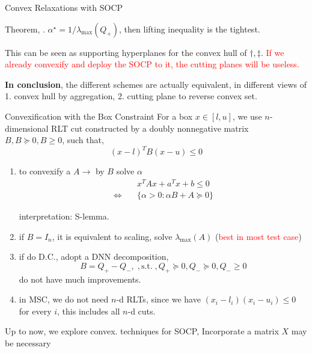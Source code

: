 \documentclass[aspectratio=1612, 10pt]{beamer}
\newcommand{\st}{\mathrm{s.t.\;}}
\newcommand{\red}[1]{\textcolor{red}{#1}}
\begin{document}
\begin{frame}[allowframebreaks]{Convex Relaxations with SOCP}
\begin{enumerate}
  \end{enumerate}

  \framebreak

  Theorem, \cite{bienstock_cutting-planes_2014}. \(\alpha^\star = 1/\lambda_{\max} (Q_+)\), then lifting inequality is the tightest.

  This can be seen as supporting hyperplanes for the convex hull of \(\dagger, \ddagger\). \red{If we already convexify and deploy the SOCP to it, the cutting planes will be useless.}

  \textbf{In conclusion},
  the different schemes are actually equivalent, in different views of 1. convex hull by aggregation, 2. cutting plane to reverse convex set.
  \framebreak

\end{frame}

\begin{frame}[allowframebreaks]{Convexification with the Box Constraint}
  For a box \(x \in [l, u]\), we use \(n\)-dimensional RLT cut constructed by a doubly nonnegative matrix \(B, B \succeq 0, B \ge 0\), such that,
  \begin{equation*}
    (x-l)^TB(x-u) \le 0
  \end{equation*}
  \begin{enumerate}
    \item to convexify a \(A \rightarrow\) by \(B\) solve \(\alpha\)
          \begin{align*}
                                  & x^TAx + a^Tx + b\le 0                 \\
            \Leftrightarrow \quad & \{\alpha >0: \alpha B + A \succeq 0\}
          \end{align*}

          interpretation: S-lemma.

          \framebreak

    \item if \(B= I_n\), it is equivalent to scaling, solve \(\lambda_{\max}(A)\)  (\red{best in most test case})
    \item if do D.C., adopt a DNN decomposition,
          \begin{equation}
            B = Q_+ - Q_-,\;, \st, Q_+ \succeq 0, Q_- \succeq 0, Q_- \ge 0
          \end{equation}
          do not have much improvements.
    \item in MSC, we do not need \(n\)-d RLTs, since we have \((x_i - l_i)(x_i - u_i) \le 0\) for every \(i\), this includes all \(n\)-d cuts.
  \end{enumerate}

  Up to now, we explore convex. techniques for SOCP, Incorporate a matrix \(X\) may be necessary
\end{frame}
\end{document}
